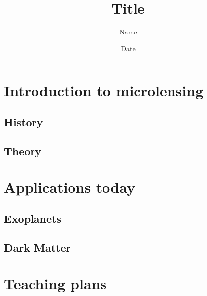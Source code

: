\documentclass[12pt,a4paper,oneside]{scrartcl}
\title{Title}
\author{Name}
\date{Date}
\begin{document}
\section{Introduction to microlensing}
\subsection{History}
\subsection{Theory}

\section{Applications today}
\subsection{Exoplanets}
\subsection{Dark Matter}


\section{Teaching plans}


\end{document}
